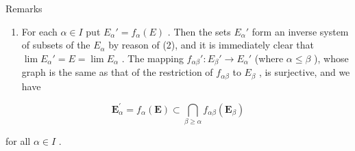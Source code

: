 Remarks

\begin{enumerate}
\def\labelenumi{(\arabic{enumi})}
\tightlist
\item
  For each \(\alpha \in I\) put \(E_{\alpha}' = f_{\alpha}(E)\) . Then the sets \(E_{\alpha}'\) form an inverse system of subsets of the \(E_{\alpha}\) by reason of (2), and it is immediately clear that \(\lim E_{\alpha}' = E = \lim E_{\alpha}\) . The mapping \(f_{\alpha\beta}' : E_{\beta}' \to E_{\alpha}'\) (where \(\alpha \leqslant \beta\) ), whose graph is the same as that of the restriction of \(f_{\alpha\beta}\) to \(E_{\beta}\) , is surjective, and we have
\end{enumerate}

\[
\mathbf {E} _ {\alpha} ^ {\prime} = f _ {\alpha} (\mathbf {E}) \subset \bigcap_ {\beta \geqslant \alpha} f _ {\alpha \beta} (\mathbf {E} _ {\beta})\tag{10}
\]

for all \(\alpha \in I\) .

